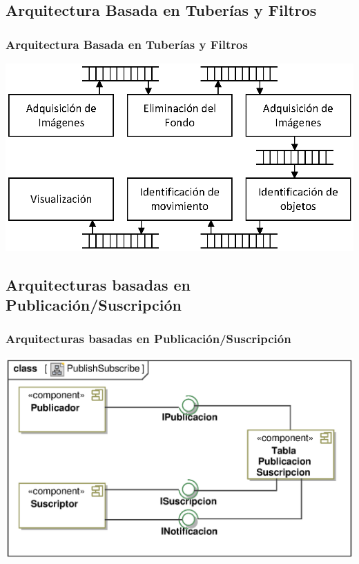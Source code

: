 ﻿\documentclass[handout,a4paper,slidestop,xcolor=pst,blue]{beamer}
\begin{document}
\subsection{Arquitectura Basada en Tuberías y Filtros}

\begin{frame}[c]
	\frametitle{Arquitectura Basada en Tuberías y Filtros}
	\begin{center}
		\includegraphics[width=\linewidth,keepaspectratio=true]{images/patterns/pipesFilters.eps}
	\end{center}
\end{frame}


\subsection{Arquitecturas basadas en Publicación/Suscripción}

\begin{frame}[c]
	\frametitle{Arquitecturas basadas en Publicación/Suscripción}
	\begin{center}
		\includegraphics[width=.85\linewidth,keepaspectratio=true]{images/patterns/publishSubscribe00.eps}
	\end{center}
\end{frame}
\end{document}
